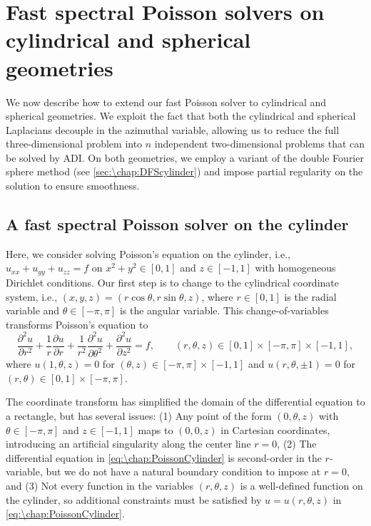 \section{Fast spectral Poisson solvers on cylindrical and spherical geometries}\label{sec:\chap:PoissonPolar}
We now describe how to extend our fast Poisson solver to cylindrical and spherical geometries. We exploit the fact that both the cylindrical and spherical Laplacians decouple in the azimuthal variable, allowing us to reduce the full three-dimensional problem into $n$ independent two-dimensional problems that can be solved by ADI. On both geometries, we employ a variant of the double Fourier sphere method \cite{Merilees_73_01} (see \cref{sec:\chap:DFScylinder}) and impose partial regularity on the solution to ensure smoothness.

\subsection{A fast spectral Poisson solver on the cylinder}\label{sec:\chap:PoissonCylinder}
Here, we consider solving Poisson's equation on the cylinder, i.e., $u_{xx} + u_{yy} + u_{zz} = f$ on $x^2+y^2 \in[0,1]$ and $z\in[-1,1]$ with homogeneous Dirichlet conditions.  Our first step is to change to the cylindrical coordinate system, i.e., $(x,y,z) = (r\cos\theta, r\sin\theta, z)$, where $r\in[0,1]$ is the radial variable and $\theta\in[-\pi,\pi]$ is the angular variable. This change-of-variables transforms Poisson's equation to
\begin{equation}
\frac{\partial^2 u}{\partial r^2} + \frac{1}{r}\frac{\partial u}{\partial r} + \frac{1}{r^2}\frac{\partial^2 u}{\partial \theta^2} + \frac{\partial^2 u}{\partial z^2} = f, \qquad (r,\theta,z)\in [0,1]\times [-\pi,\pi]\times [-1,1],
\label{eq:\chap:PoissonCylinder}
\end{equation}
where $u(1,\theta,z) = 0$ for $(\theta,z)\in[-\pi,\pi]\times [-1,1]$ and $u(r,\theta,\pm 1) = 0$ for $(r,\theta)\in[0,1]\times [-\pi,\pi]$.

The coordinate transform has simplified the domain of the differential equation to a rectangle, but has several issues: (1) Any point of the form $(0,\theta,z)$ with $\theta\in[-\pi,\pi]$ and $z\in[-1,1]$ maps to $(0,0,z)$ in Cartesian coordinates, introducing an artificial singularity along the center line $r=0$, (2) The differential equation in \cref{eq:\chap:PoissonCylinder} is second-order in the $r$-variable, but we do not have a natural boundary condition to impose at $r = 0$, and (3) Not every function in the variables $(r,\theta,z)$ is a well-defined function on the cylinder, so additional constraints must be satisfied by $u = u(r,\theta,z)$ in \cref{eq:\chap:PoissonCylinder}.

